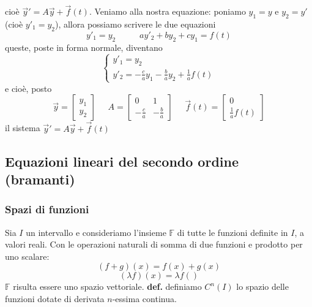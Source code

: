 cioè $\vec{y}' = A \vec{y} + \vec{f}(t)$.\newline
\newline
Veniamo alla nostra equazione: poniamo $y_1 = y$ e $y_2 = y'$ (cioè $y'_1 = y_2$), allora possiamo scrivere le due equazioni
\[
    y'_1 = y_2 \;\;\;\;\;\;\;\;\;\;ay'_2 + by_2 + cy_1 = f(t)
\]
queste, poste in forma normale, diventano
\[
    \begin{cases}
        y'_1 = y_2\\
        y'_2 = - \frac{c}{a}y_1 - \frac{b}{a}y_2 + \frac{1}{a} f(t)
    \end{cases}
\]
e cioè, posto
\[
    \vec{y} = \left[\begin{matrix}
        y_1\\y_2
    \end{matrix}\right] \;\;\;\;\; A = \left[\begin{matrix}
        0 & 1  \\ -\frac{c}{a} & - \frac{b}{a}
    \end{matrix}\right] \;\;\;\;\; \vec{f}(t) = \left[\begin{matrix}
        0 \\ \frac{1}{a}f(t)
    \end{matrix}\right]
\]
il sistema $\vec{y}' = A \vec{y} + \vec{f}(t)$
\subsection{Equazioni lineari del secondo ordine (bramanti)}
\subsubsection{Spazi di funzioni}
Sia $I$ un intervallo e consideriamo l'insieme $\mathbb{F}$ di tutte le funzioni definite in $I$, a valori reali. Con le operazioni naturali di somma di due funzioni e prodotto per uno scalare:
\[
    (f+g)(x) = f(x) + g(x)
\]
\[
    (\lambda f)(x) = \lambda f()
\]
$\mathbb{F}$ risulta essere uno spazio vettoriale. \newline
\newline
\textbf{def.} definiamo $C^n(I)$ lo spazio delle funzioni dotate di derivata $n$-essima continua.
